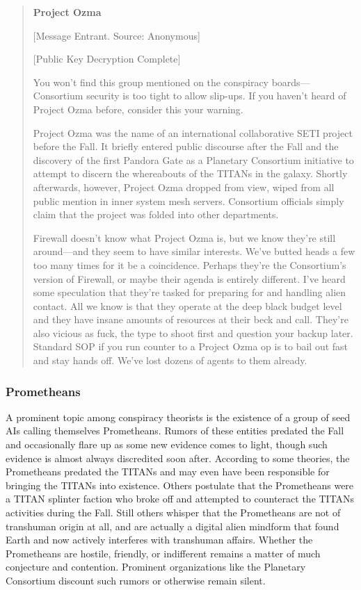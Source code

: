 \begin{quotation} \textbf{Project Ozma} 

[Message Entrant. Source: Anonymous] 

[Public Key Decryption Complete] 

You won’t find this group mentioned on the conspiracy boards—Consortium security is too tight to allow slip-ups. If you haven’t heard of Project Ozma before, consider this your warning. 

Project Ozma was the name of an international collaborative SETI project before the Fall. It briefly entered public discourse after the Fall and the discovery of the first Pandora Gate as a Planetary Consortium initiative to attempt to discern the whereabouts of the TITANs in the galaxy. Shortly afterwards, however, Project Ozma dropped from view, wiped from all public mention in inner system mesh servers. Consortium officials simply claim that the project was folded into other departments. 

Firewall doesn’t know what Project Ozma is, but we know they’re still around—and they seem to have similar interests. We’ve butted heads a few too many times for it be a coincidence. Perhaps they’re the Consortium’s version of Firewall, or maybe their agenda is entirely different. I’ve heard some speculation that they’re tasked for preparing for and handling alien contact. All we know is that they operate at the deep black budget level and they have insane amounts of resources at their beck and call. They’re also vicious as fuck, the type to shoot first and question your backup later. Standard SOP if you run counter to a Project Ozma op is to bail out fast and stay hands off. We’ve lost dozens of agents to them already. \end{quotation} 

\subsubsection{Prometheans} \label{sec:prometheans} 

A prominent topic among conspiracy theorists is the existence of a group of seed AIs calling themselves Prometheans. Rumors of these entities predated the Fall and occasionally flare up as some new evidence comes to light, though such evidence is almost always discredited soon after. According to some theories, the Prometheans predated the TITANs and may even have been responsible for bringing the TITANs into existence. Others postulate that the Prometheans were a TITAN splinter faction who broke off and attempted to counteract the TITANs activities during the Fall. Still others whisper that the Prometheans are not of transhuman origin at all, and are actually a digital alien mindform that found Earth and now actively interferes with transhuman affairs. Whether the Prometheans are hostile, friendly, or indifferent remains a matter of much conjecture and contention. Prominent organizations like the Planetary Consortium discount such rumors or otherwise remain silent. 


